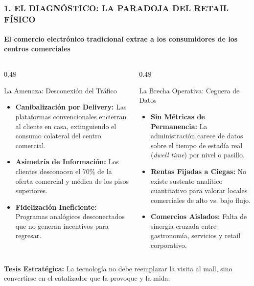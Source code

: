 \documentclass[aspectratio=169, 10pt]{beamer}
\begin{document}
\begin{frame}
  \frametitle{1. EL DIAGNÓSTICO: LA PARADOJA DEL RETAIL FÍSICO}
  \framesubtitle{El comercio electrónico tradicional extrae a los consumidores de los centros comerciales}

  \begin{columns}[T]
    \begin{column}{0.48\textwidth}
      \begin{alertblock}{La Amenaza: Desconexión del Tráfico}
        \small
        \begin{itemize}\setlength\itemsep{0.35em}
          \item \textbf{Canibalización por Delivery:} Las plataformas convencionales encierran al cliente en casa, extinguiendo el consumo colateral del centro comercial.
          \item \textbf{Asimetría de Información:} Los clientes desconocen el 70\% de la oferta comercial y médica de los pisos superiores.
          \item \textbf{Fidelización Ineficiente:} Programas analógicos desconectados que no generan incentivos para regresar.
        \end{itemize}
      \end{alertblock}
    \end{column}

    \begin{column}{0.48\textwidth}
      \begin{block}{La Brecha Operativa: Ceguera de Datos}
        \small
        \begin{itemize}\setlength\itemsep{0.35em}
          \item \textbf{Sin Métricas de Permanencia:} La administración carece de datos sobre el tiempo de estadía real (\textit{dwell time}) por nivel o pasillo.
          \item \textbf{Rentas Fijadas a Ciegas:} No existe sustento analítico cuantitativo para valorar locales comerciales de alto vs. bajo flujo.
          \item \textbf{Comercios Aislados:} Falta de sinergia cruzada entre gastronomía, servicios y retail corporativo.
        \end{itemize}
      \end{block}
    \end{column}
  \end{columns}

  \vskip 0.3cm
  \centering
  \color{EmeraldLight}\footnotesize \textbf{Tesis Estratégica:} La tecnología no debe reemplazar la visita al mall, sino convertirse en el catalizador que la provoque y la mida.
\end{frame}
\end{document}
